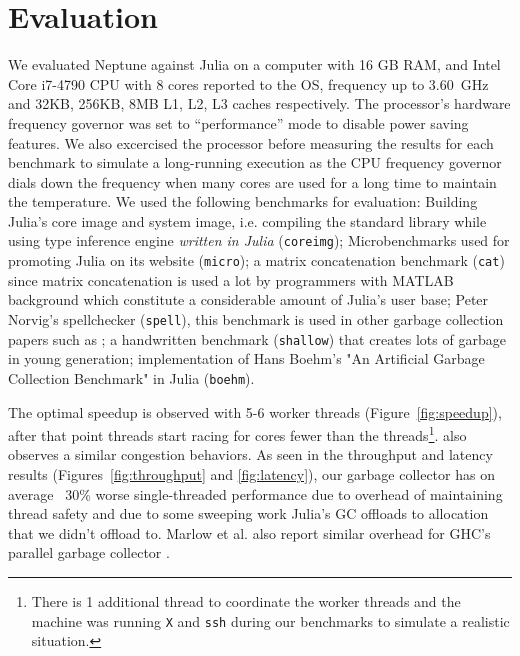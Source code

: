 \section{Evaluation} \label{evaluation}

We evaluated Neptune against Julia on a computer with 16 GB RAM, and Intel Core i7-4790 CPU with 8 cores reported to the OS, frequency up to $3.60$~GHz and 32KB, 256KB, 8MB L1, L2, L3 caches respectively.
The processor's hardware frequency governor was set to ``performance'' mode to disable power saving features.
We also excercised the processor before measuring the results for each benchmark to simulate a long-running execution as the CPU frequency governor dials down the frequency when many cores are used for a long time to maintain the temperature.
We used the following benchmarks for evaluation: Building Julia's core image and system image, i.e. compiling the standard library while using type inference engine \emph{written in Julia} (\texttt{coreimg}); Microbenchmarks used for promoting Julia on its website (\texttt{micro}); a matrix concatenation benchmark (\texttt{cat}) since matrix concatenation is used a lot by programmers with MATLAB background which constitute a considerable amount of Julia's user base; Peter Norvig's spellchecker (\texttt{spell}), this benchmark is used in other garbage collection papers such as \cite{marlow2008parallel}; a handwritten benchmark (\texttt{shallow}) that creates lots of garbage in young generation; implementation of Hans Boehm's "An Artificial Garbage Collection Benchmark" in Julia (\texttt{boehm}).

The optimal speedup is observed with 5-6 worker threads (Figure~\ref{fig:speedup}), after that point threads start racing for cores fewer than the threads\footnote{There is 1 additional thread to coordinate the worker threads and the machine was running \texttt{X} and \texttt{ssh} during our benchmarks to simulate a realistic situation.}.
\cite{marlow2011multicore} also observes a similar congestion behaviors.
As seen in the throughput and latency results (Figures~\ref{fig:throughput} and \ref{fig:latency}), our garbage collector has on average ~30\% worse single-threaded performance due to overhead of maintaining thread safety and due to some sweeping work Julia's GC offloads to allocation that we didn't offload to.
Marlow et al. also report similar overhead for GHC's parallel garbage collector \cite{marlow2008parallel}.

